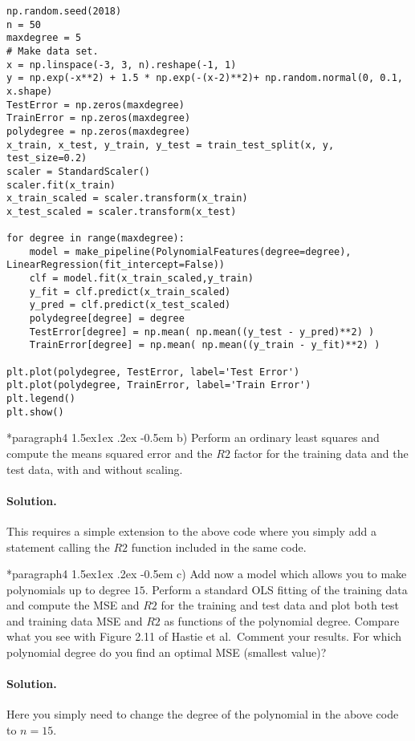 \documentclass[%
oneside,                 %
final,                   %
10pt]{article}
\makeatletter
\newenvironment{doconceexercise}{}{}
\newcommand\subex{\@startsection*{paragraph}{4}{\z@}%
                  {1.5ex\@plus1ex \@minus.2ex}%
                  {-0.5em}%
                  {\normalfont\normalsize\bfseries}}
\makeatother
\begin{document}
\begin{doconceexercise}
\begin{verbatim}
np.random.seed(2018)
n = 50
maxdegree = 5
# Make data set.
x = np.linspace(-3, 3, n).reshape(-1, 1)
y = np.exp(-x**2) + 1.5 * np.exp(-(x-2)**2)+ np.random.normal(0, 0.1, x.shape)
TestError = np.zeros(maxdegree)
TrainError = np.zeros(maxdegree)
polydegree = np.zeros(maxdegree)
x_train, x_test, y_train, y_test = train_test_split(x, y, test_size=0.2)
scaler = StandardScaler()
scaler.fit(x_train)
x_train_scaled = scaler.transform(x_train)
x_test_scaled = scaler.transform(x_test)

for degree in range(maxdegree):
    model = make_pipeline(PolynomialFeatures(degree=degree), LinearRegression(fit_intercept=False))
    clf = model.fit(x_train_scaled,y_train)
    y_fit = clf.predict(x_train_scaled)
    y_pred = clf.predict(x_test_scaled) 
    polydegree[degree] = degree
    TestError[degree] = np.mean( np.mean((y_test - y_pred)**2) )
    TrainError[degree] = np.mean( np.mean((y_train - y_fit)**2) )

plt.plot(polydegree, TestError, label='Test Error')
plt.plot(polydegree, TrainError, label='Train Error')
plt.legend()
plt.show()
\end{verbatim}

\subex{b)}
Perform an ordinary least squares and compute the means squared error and the $R2$ factor for the training data and the test data, with and without scaling.


\paragraph{Solution.}
This requires a simple extension to the above code where you simply add a statement calling the $R2$ function included in the same code.

\subex{c)}
Add now a model which allows you to make polynomials up to degree $15$.  Perform a standard OLS fitting of the training data and compute the MSE and $R2$ for the training and test data and plot both test and training data MSE and $R2$ as functions of the polynomial degree. Compare what you see with Figure 2.11 of Hastie et al.~Comment your results. For which polynomial degree do you find an optimal MSE (smallest value)?


\paragraph{Solution.}
Here you simply need to change the degree of the polynomial in the above code to $n=15$.


\end{doconceexercise}
\end{document}
